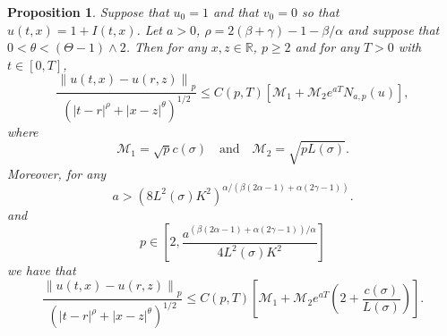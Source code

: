 \documentclass[a4paper,11pt]{article}
\numberwithin{equation}{section}
\theoremstyle{plain}
\newtheorem{proposition}[theorem]{Proposition}
\theoremstyle{definition}
\newcommand{\Norm}[1]{\left\|  #1   \right\|}
\newcommand{\R}{\mathbb{R}}
\numberwithin{NQ}{section}
\numberwithin{LQ}{section}
\numberwithin{ZQ}{section}
\begin{document}
	\begin{proposition}
	\label{P:NormInc}
Suppose that $u_0=1$ and that $v_0 =0$ so that $u(t,x) = 1 + I(t,x)$. Let $a>0$, $\rho = 2(\beta + \gamma) -1 - \beta/\alpha$ and suppose that $0< \theta < (\Theta -1) \wedge 2$. Then for any $x,z \in \R$, $p\ge 2$ and for any $T>0$ with $t\in [0,T]$,
	\begin{equation}
	\label{E:NormInc_N(u)}
		\frac{\Norm{u(t,x)-u(r,z)}_p}{\left(|t-r|^{\rho} + |x-z|^{\theta}\right)^{1/2}} \le 	C(p,T)\left[ \mathcal{M}_1 + \mathcal{M}_2 e^{aT} N_{a,p}(u)\right] ,
	\end{equation}
where 
\[
	\mathcal{M}_1 = \sqrt{p}c(\sigma) \quad \text{and} \quad\mathcal{M}_2 =\sqrt{pL(\sigma)}.
\]
Moreover, for any 
\[
a > \left( 8 L^2(\sigma)K^2\right)^{\alpha/(\beta(2\alpha-1)+\alpha(2\gamma -1))}.
\]
and 
\[
p \in \left[ 2, \frac{a^{(\beta(2\alpha-1)+\alpha(2\gamma-1))/\alpha}}{4L^2(\sigma)K^2} \right]
\]
we have that 
	\begin{equation}
	\label{E:NormInc_cL}
		\frac{\Norm{u(t,x)-u(r,z)}_p}{\left(|t-r|^{\rho} + |x-z|^{\theta}\right)^{1/2}} \le C(p,T)\left[ \mathcal{M}_1 + \mathcal{M}_2 e^{aT} \left( 2 +  \frac{c(\sigma)}{L(\sigma)} \right)\right].
	\end{equation}
	\end{proposition}
\end{document}
